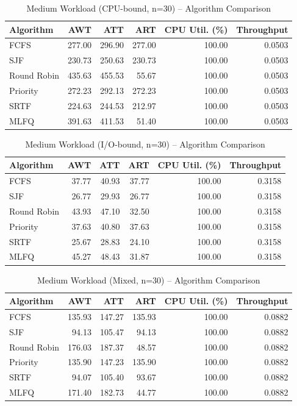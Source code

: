 \begin{table}[H]
\centering
\small
\begin{tabular}{lrrrrr}
\toprule
Algorithm & AWT & ATT & ART & CPU Util. (\%) & Throughput \\
\midrule
FCFS & 277.00 & 296.90 & 277.00 & 100.00 & 0.0503 \\
SJF & 230.73 & 250.63 & 230.73 & 100.00 & 0.0503 \\
Round Robin & 435.63 & 455.53 & 55.67 & 100.00 & 0.0503 \\
Priority & 272.23 & 292.13 & 272.23 & 100.00 & 0.0503 \\
SRTF & 224.63 & 244.53 & 212.97 & 100.00 & 0.0503 \\
MLFQ & 391.63 & 411.53 & 51.40 & 100.00 & 0.0503 \\
\bottomrule
\end{tabular}
\caption{Medium Workload (CPU-bound, n=30) -- Algorithm Comparison}
\label{tab:medium_cpu_bound}
\end{table}

\begin{table}[H]
\centering
\small
\begin{tabular}{lrrrrr}
\toprule
Algorithm & AWT & ATT & ART & CPU Util. (\%) & Throughput \\
\midrule
FCFS & 37.77 & 40.93 & 37.77 & 100.00 & 0.3158 \\
SJF & 26.77 & 29.93 & 26.77 & 100.00 & 0.3158 \\
Round Robin & 43.93 & 47.10 & 32.50 & 100.00 & 0.3158 \\
Priority & 37.63 & 40.80 & 37.63 & 100.00 & 0.3158 \\
SRTF & 25.67 & 28.83 & 24.10 & 100.00 & 0.3158 \\
MLFQ & 45.27 & 48.43 & 31.87 & 100.00 & 0.3158 \\
\bottomrule
\end{tabular}
\caption{Medium Workload (I/O-bound, n=30) -- Algorithm Comparison}
\label{tab:medium_io_bound}
\end{table}

\begin{table}[H]
\centering
\small
\begin{tabular}{lrrrrr}
\toprule
Algorithm & AWT & ATT & ART & CPU Util. (\%) & Throughput \\
\midrule
FCFS & 135.93 & 147.27 & 135.93 & 100.00 & 0.0882 \\
SJF & 94.13 & 105.47 & 94.13 & 100.00 & 0.0882 \\
Round Robin & 176.03 & 187.37 & 48.57 & 100.00 & 0.0882 \\
Priority & 135.90 & 147.23 & 135.90 & 100.00 & 0.0882 \\
SRTF & 94.07 & 105.40 & 93.67 & 100.00 & 0.0882 \\
MLFQ & 171.40 & 182.73 & 44.77 & 100.00 & 0.0882 \\
\bottomrule
\end{tabular}
\caption{Medium Workload (Mixed, n=30) -- Algorithm Comparison}
\label{tab:medium_mixed}
\end{table}

